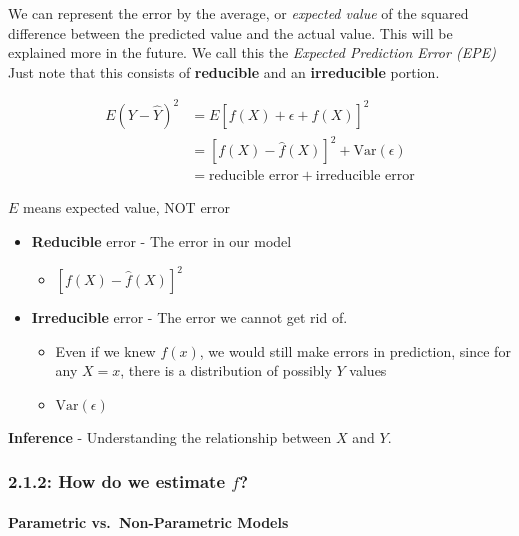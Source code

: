 We can represent the error by the average, or \emph{expected value} of
the squared difference between the predicted value and the actual value.
This will be explained more in the future. We call this the
\emph{Expected Prediction Error (EPE)} Just note that this consists of
\textbf{reducible} and an \textbf{irreducible} portion.

\begin{align*}
E(Y-\hat Y)^2 &= E[f(X) + \epsilon + \hat f(X)]^2 \\
&= [f(X)-\hat f(X)]^2 + \text{Var}(\epsilon)\\
&= \text{reducible error} + \text{irreducible error}
\end{align*}

\begin{note}
	\(E\) means expected value, NOT error
\end{note}

\begin{itemize}
\tightlist
\item
  \textbf{Reducible} error - The error in our model

  \begin{itemize}
  \tightlist
  \item
    \([f(X)-\hat f(X)]^2\)
  \end{itemize}
\item
  \textbf{Irreducible} error - The error we cannot get rid of.

  \begin{itemize}
  \tightlist
  \item
    Even if we knew \(f(x)\), we would still make errors in prediction,     since for any \(X=x\), there is a distribution of possibly \(Y\) values
  \item  \(\text{Var}(\epsilon)\)
  \end{itemize}
\end{itemize}

\textbf{Inference} - Understanding the relationship between \(X\) and
\(Y\).

\subsubsection*{\texorpdfstring{2.1.2: How do we estimate
\(f\)?}{2.1.2: How do we estimate f?}}\label{how-do-we-estimate-f}

\paragraph*{Parametric vs.~Non-Parametric Models}\label{parametric-vs.-non-parametric-models}

